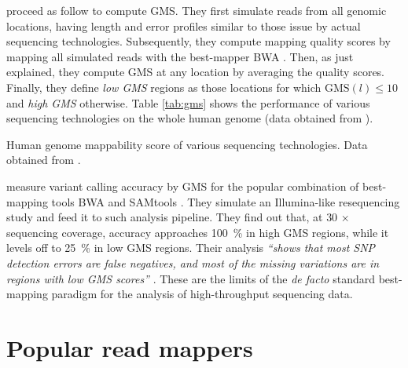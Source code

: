 \citeauthor{Lee2012} proceed as follow to compute GMS.
They first simulate reads from all genomic locations, having length and error profiles similar to those issue by actual sequencing technologies.
Subsequently, they compute mapping quality scores by mapping all simulated reads with the best-mapper BWA \citep{Li2009}.
Then, as just explained, they compute GMS at any location by averaging the quality scores.
Finally, they define \emph{low GMS} regions as those locations for which $\text{GMS}(l) \leq 10$ and \emph{high GMS} otherwise.
Table \ref{tab:gms} shows the performance of various sequencing technologies on the whole human genome (data obtained from \citep{Lee2012}).

\begin{table}[h]
\begin{center}
\caption[Human genome mappability score]{Human genome mappability score of various sequencing technologies. Data obtained from \citep{Lee2012}.}
\sffamily

\label{tab:gms}
\end{center}
\end{table}

\citeauthor{Lee2012} measure variant calling accuracy by GMS for the popular combination of best-mapping tools BWA and SAMtools \citep{Li2009a}.
They simulate an Illumina-like resequencing study and feed it to such analysis pipeline.
They find out that, at $30\,\times$ sequencing coverage, accuracy approaches 100~\% in high GMS regions, while it levels off to 25~\% in low GMS regions.
Their analysis \emph{``shows that most SNP detection errors are false negatives, and most of the missing variations are in regions with low GMS scores''} \citep{Lee2012}.
These are the limits of the \emph{de facto} standard best-mapping paradigm for the analysis of high-throughput sequencing data.



\section{Popular read mappers}

